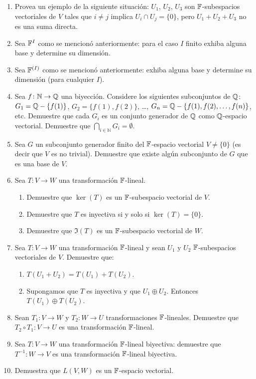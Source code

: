 \begin{enumerate}
  \item Provea un ejemplo de la siguiente situación: $U_1$, $U_2$, $U_3$ son $\mathbb{F}$-subespacios vectoriales de $V$ tales que $i \neq j$ implica $U_i \cap U_j = \{0\}$, pero $U_1 + U_2 + U_3$ no es una suma directa.
  
  \item Sea $\mathbb{F}^I$ como se mencionó anteriormente: para el caso $I$ finito exhiba alguna base y determine su dimensión.
  
  \item Sea $\mathbb{F}^{(I)}$ como se mencionó anteriormente: exhiba alguna base y determine su dimensión (para cualquier $I$).
  
  \item Sea $f \colon \mathbb{N} \to \mathbb{Q}$ una biyección. Considere los siguientes subconjuntos de $\mathbb{Q}$: $G_1 = \mathbb{Q} - \{ f(1)\}$, $G_2 = \{ f(1), f(2) \}$, \dots, $G_n = \mathbb{Q} - \{ f(1), f(2), \ldots, f(n) \}$, etc. Demuestre que cada $G_i$ es un conjunto generador de $\mathbb{Q}$ como $\mathbb{Q}$-espacio vectorial. Demuestre que $\bigcap _{i \in \mathbb{N}} G_i = \emptyset$.
  
  \item Sea $G$ un subconjunto generador finito del $\mathbb{F}$-espacio vectorial $V \neq \{0\}$ (es decir que $V$ es no trivial). Demuestre que existe algún subconjunto de $G$ que es una base de $V$.
  
  \item Sea $T\colon V \to W$ una transformación $\mathbb{F}$-lineal.
    \begin{enumerate}
      \item Demuestre que $\ker(T)$ es un $\mathbb{F}$-subespacio vectorial de $V$.
      \item Demuestre que $T$ es inyectiva si y solo si $\ker(T) = \{0\}$.
      \item Demuestre que $\Im(T)$ es un $\mathbb{F}$-subespacio vectorial de $W$.
    \end{enumerate}

  \item Sea $T\colon V \to W$ una transformación $\mathbb{F}$-lineal y sean $U_1$ y $U_2$ $\mathbb{F}$-subespacios vectoriales de $V$. Demuestre que:
    \begin{enumerate}
      \item $T(U_1 + U_2) = T(U_1) + T(U_2)$.
      \item Supongamos que $T$ es inyectiva y que $U_1 \oplus U_2$. Entonces $T(U_1) \oplus T(U_2)$.
    \end{enumerate}

  \item Sean $T_1\colon V \to W$ y $T_2\colon W \to U$ transformaciones $\mathbb{F}$-lineales. Demuestre que $T_2 \circ T_1 \colon V \to U$ es una transformación $\mathbb{F}$-lineal.
  
  \item Sea $T\colon V \to W$ una transformación $\mathbb{F}$-lineal biyectiva: demuestre que $T^{-1}\colon W \to V$ es una transformación $\mathbb{F}$-lineal biyectiva.
  
  \item Demuestra que $L(V,W)$ es un $\mathbb{F}$-espacio vectorial.
\end{enumerate}